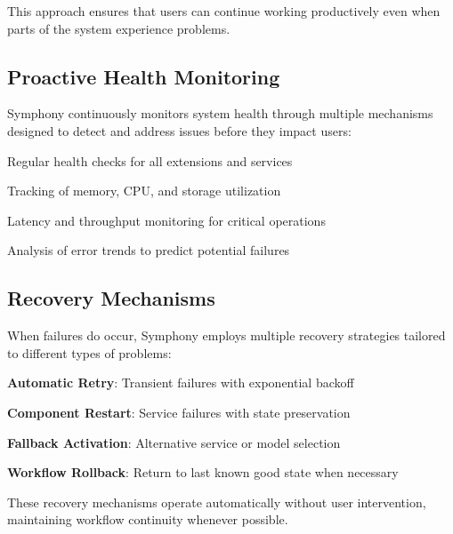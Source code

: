 This approach ensures that users can continue working productively even when parts of the system experience problems.

\subsection*{Proactive Health Monitoring}

Symphony continuously monitors system health through multiple mechanisms designed to detect and address issues before they impact users:

\begin{description}[leftmargin=3cm,labelwidth=2.5cm]
    \item[\textbf{Component Health}] Regular health checks for all extensions and services
    \item[\textbf{Resource Monitoring}] Tracking of memory, CPU, and storage utilization
    \item[\textbf{Performance Metrics}] Latency and throughput monitoring for critical operations
    \item[\textbf{Error Pattern Detection}] Analysis of error trends to predict potential failures
\end{description}

\subsection*{Recovery Mechanisms}

When failures do occur, Symphony employs multiple recovery strategies tailored to different types of problems:

\begin{infobox}[title=Recovery Strategy Hierarchy]
\begin{compactlist}
    \item \textbf{Automatic Retry}: Transient failures with exponential backoff
    \item \textbf{Component Restart}: Service failures with state preservation
    \item \textbf{Fallback Activation}: Alternative service or model selection
    \item \textbf{Workflow Rollback}: Return to last known good state when necessary
\end{compactlist}
\end{infobox}

These recovery mechanisms operate automatically without user intervention, maintaining workflow continuity whenever possible.

